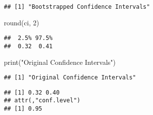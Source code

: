 \documentclass[
]{article}
\newenvironment{Shaded}{\begin{snugshade}}{\end{snugshade}}
\newcommand{\DecValTok}[1]{\textcolor[rgb]{0.00,0.00,0.81}{#1}}
\newcommand{\FunctionTok}[1]{\textcolor[rgb]{0.00,0.00,0.00}{#1}}
\newcommand{\NormalTok}[1]{#1}
\newcommand{\SpecialCharTok}[1]{\textcolor[rgb]{0.00,0.00,0.00}{#1}}
\newcommand{\StringTok}[1]{\textcolor[rgb]{0.31,0.60,0.02}{#1}}
\begin{document}
\begin{verbatim}
## [1] "Bootstrapped Confidence Intervals"
\end{verbatim}

\begin{Shaded}
\begin{Highlighting}[]
\FunctionTok{round}\NormalTok{(ci, }\DecValTok{2}\NormalTok{)}
\end{Highlighting}
\end{Shaded}

\begin{verbatim}
##  2.5% 97.5% 
##  0.32  0.41
\end{verbatim}

\begin{Shaded}
\begin{Highlighting}[]
\FunctionTok{print}\NormalTok{(}\StringTok{"Original Confidence Intervals"}\NormalTok{)}
\end{Highlighting}
\end{Shaded}

\begin{verbatim}
## [1] "Original Confidence Intervals"
\end{verbatim}

\begin{Shaded}
\end{Shaded}

\begin{verbatim}
## [1] 0.32 0.40
## attr(,"conf.level")
## [1] 0.95
\end{verbatim}
\end{document}
